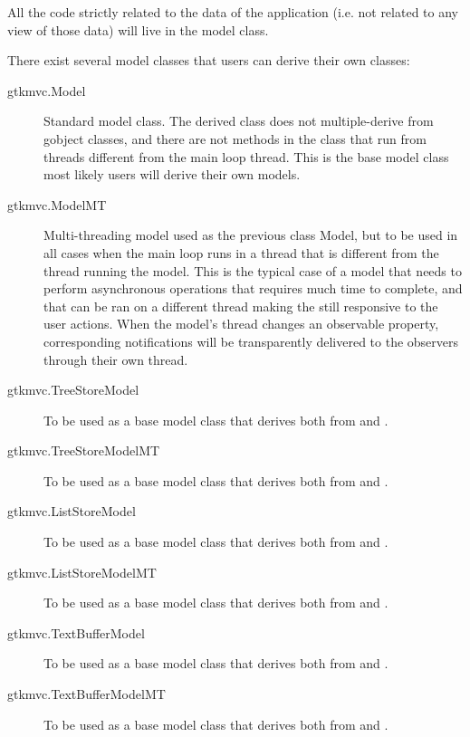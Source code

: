 All the code strictly related to the data of the application (i.e. not
related to any view of those data) will live in the model class. 

There exist several model classes that users can derive their own
classes:

\begin {description}
\item [gtkmvc.Model] Standard model class. The derived class does not
  multiple-derive from gobject classes, and there are not methods in
  the class that run from threads different from the \pygtk main loop
  thread. This is the base model class most likely users will derive
  their own models.

\item [gtkmvc.ModelMT] Multi-threading model used as the previous
  class Model, but to be used in all cases when the \pygtk main loop
  runs in a thread that is different from the thread running the
  model. This is the typical case of a model that needs to perform
  asynchronous operations that requires much time to complete, and
  that can be ran on a different thread making the \gui still
  responsive to the user actions. When the model's thread changes an
  observable property, corresponding notifications will be
  transparently delivered to the observers through their own thread.

\item [gtkmvc.TreeStoreModel] To be used as a base model class that
  derives both from  and .

\item [gtkmvc.TreeStoreModelMT] To be used as a base model class that
  derives both from  and .

\item [gtkmvc.ListStoreModel] To be used as a base model class that
  derives both from  and .

\item [gtkmvc.ListStoreModelMT] To be used as a base model class that
  derives both from  and . 

\item [gtkmvc.TextBufferModel] To be used as a base model class that
  derives both from  and .

\item [gtkmvc.TextBufferModelMT] To be used as a base model class that
  derives both from  and .

\end{description}


